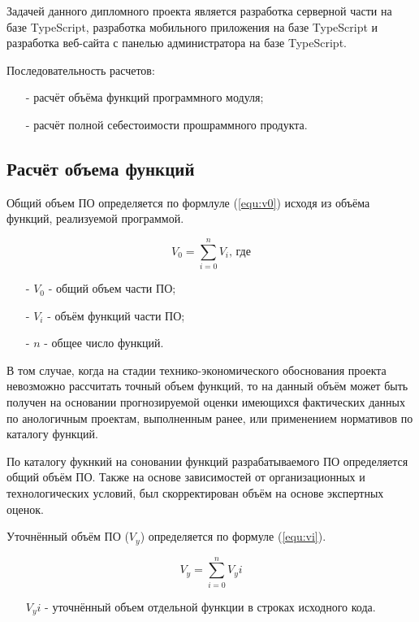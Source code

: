 Задачей данного дипломного проекта является
разработка серверной части на базе TypeScript,
разработка мобильного приложения на базе TypeScript
и разработка веб-сайта с панелью администратора на базе TypeScript.

Последовательность расчетов:

\begin{enumerate}
    \item[-] расчёт объёма функций программного модуля;
    \item[-] расчёт полной себестоимости прошраммного продукта.
\end{enumerate}

\subsection{Расчёт объема функций}

Общий объем ПО определяется по формлуле (\ref{equ:v0}) исходя из объёма функций, реализуемой программой.

\begin{equation}
    \label{equ:v0}
    V_0 = \sum^n_{i=0} V_i \text{, где}
\end{equation}

\begin{enumerate}
    \item[-] $V_0$ - общий объем части ПО; 
    \item[-] $V_i$ - объём функций части ПО;  
    \item[-] $n$ - общее число функций.
\end{enumerate}

В том случае, когда на стадии технико-экономического обоснования проекта невозможно рассчитать точный объем функций,
то на данный объём может быть получен на основании прогнозируемой оценки имеющихся фактических данных по анологичным проектам, выполненным ранее,
или применением нормативов по каталогу функций.

По каталогу фукнкий на соновании функций разрабатываемого ПО определяется общий объём ПО.
Также на основе зависимостей от организационных и технологических условий,
был скорректирован объём на основе экспертных оценок.

Уточнённый объём ПО ($V_y$) определяется по формуле (\ref{equ:vi}).

\begin{equation}
    \label{equ:vi}
    V_y = \sum^n_{i=0} V_yi
\end{equation}

\begin{enumerate}
    \item[] $V_yi$ - уточнённый объем отдельной функции в строках исходного кода.
\end{enumerate}

